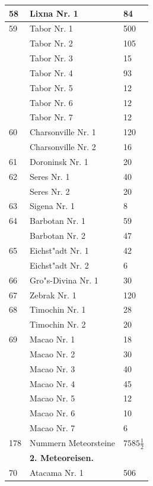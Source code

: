 \documentclass[a4paper, 11pt, oneside, polutonikogreek, german]{article}
\begin{document}
\begin{center}
\begin{longtable}{|l|l|l|}
        58 & Lixna Nr. 1 & 84 \\ \hline
        59 & Tabor Nr. 1 & 500 \\ \hline
          & Tabor Nr. 2 & 105 \\ \hline
          & Tabor Nr. 3 & 15 \\ \hline
          & Tabor Nr. 4 & 93 \\ \hline
          & Tabor Nr. 5 & 12 \\ \hline
          & Tabor Nr. 6 & 12 \\ \hline
          & Tabor Nr. 7 & 12 \\ \hline
        60 & Charsonville Nr. 1 & 120 \\ \hline
          & Charsonville Nr. 2 & 16 \\ \hline
        61 & Doroninsk Nr. 1 & 20 \\ \hline
        62 & Seres Nr. 1 & 40 \\ \hline
          & Seres Nr. 2 & 20 \\ \hline
        63 & Sigena Nr. 1 & 8 \\ \hline
        64 & Barbotan Nr. 1 & 59 \\ \hline
          & Barbotan Nr. 2 & 47 \\ \hline
        65 & Eichst"adt Nr. 1 & 42 \\ \hline
          & Eichst"adt Nr. 2 & 6 \\ \hline
        66 & Gro"s-Divina Nr. 1 & 30 \\ \hline
        67 & Zebrak Nr. 1 & 120 \\ \hline
        68 & Timochin Nr. 1 & 28 \\ \hline
          & Timochin Nr. 2 & 20 \\ \hline
        69 & Macao Nr. 1 & 18 \\ \hline
          & Macao Nr. 2 & 30 \\ \hline
          & Macao Nr. 3 & 40 \\ \hline
          & Macao Nr. 4 & 45 \\ \hline
          & Macao Nr. 5 & 12 \\ \hline
          & Macao Nr. 6 & 10 \\ \hline
          & Macao Nr. 7 & 6 \\ \hline
        178 & Nummern Meteorsteine & $\mathfrak{7585\frac{1}{2}}$ \\ \hline
          & \textbf{2. Meteoreisen.} &   \\ \hline
        70 & Atacama Nr. 1 & 506 \\ \hline

\end{longtable}
\end{center}
\end{document}
